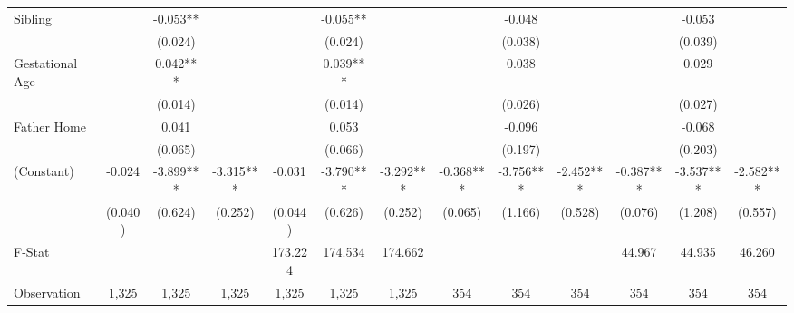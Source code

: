 \begin{tabular}{lcccccccccccc}
Sibling &  & -0.053** &  &  & -0.055** &  &  & -0.048 &  &  & -0.053 &  \\
 &  & (0.024) &  &  & (0.024) &  &  & (0.038) &  &  & (0.039) &  \\
Gestational Age &  & 0.042*** &  &  & 0.039*** &  &  & 0.038 &  &  & 0.029 &  \\
 &  & (0.014) &  &  & (0.014) &  &  & (0.026) &  &  & (0.027) &  \\
Father Home &  & 0.041 &  &  & 0.053 &  &  & -0.096 &  &  & -0.068 &  \\
 &  & (0.065) &  &  & (0.066) &  &  & (0.197) &  &  & (0.203) &  \\
(Constant) & -0.024 & -3.899*** & -3.315*** & -0.031 & -3.790*** & -3.292*** & -0.368*** & -3.756*** & -2.452*** & -0.387*** & -3.537*** & -2.582*** \\
 & (0.040) & (0.624) & (0.252) & (0.044) & (0.626) & (0.252) & (0.065) & (1.166) & (0.528) & (0.076) & (1.208) & (0.557) \\
\midrule 
F-Stat &  &  &  & 173.224 & 174.534 & 174.662 &  &  &  & 44.967 & 44.935 & 46.260 \\
Observation & 1,325 & 1,325 & 1,325 & 1,325 & 1,325 & 1,325 & 354 & 354 & 354 & 354 & 354 & 354 \\
\midrule 
\bottomrule 
\end{tabular}
